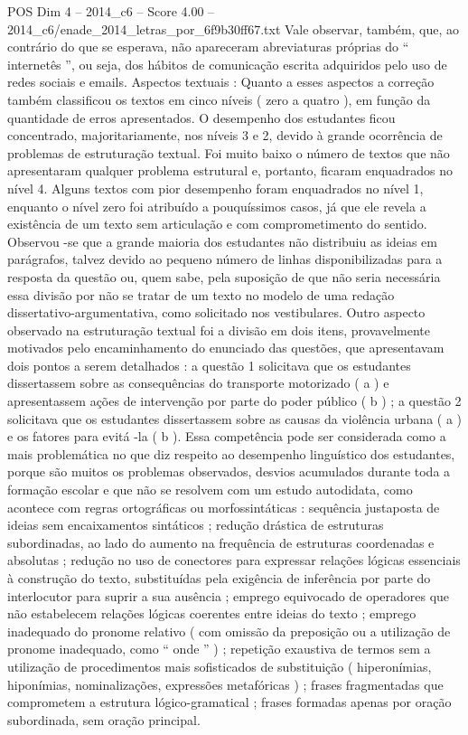 \begin{textsample}{POS Dim 4 – 2014\_c6 – Score 4.00 – 2014\_c6/enade\_2014\_letras\_por\_6f9b30ff67.txt}
Vale observar, também, que, ao contrário do que se esperava, não apareceram abreviaturas próprias do “ internetês ”, ou seja, dos hábitos de comunicação escrita adquiridos pelo uso de redes sociais e emails.
Aspectos textuais : Quanto a esses aspectos a correção também classificou os textos em cinco níveis ( zero a quatro ), em função da quantidade de erros apresentados.
O desempenho dos estudantes ficou concentrado, majoritariamente, nos níveis 3 e 2, devido à grande ocorrência de problemas de estruturação textual.
Foi muito baixo o número de textos que não apresentaram qualquer problema estrutural e, portanto, ficaram enquadrados no nível 4.
Alguns textos com pior desempenho foram enquadrados no nível 1, enquanto o nível zero foi atribuído a pouquíssimos casos, já que ele revela a existência de um texto sem articulação e com comprometimento do sentido.
Observou -se que a grande maioria dos estudantes não distribuiu as ideias em parágrafos, talvez devido ao pequeno número de linhas disponibilizadas para a resposta da questão ou, quem sabe, pela suposição de que não seria necessária essa divisão por não se tratar de um texto no modelo de uma redação dissertativo-argumentativa, como solicitado nos vestibulares.
Outro aspecto observado na estruturação textual foi a divisão em dois itens, provavelmente motivados pelo encaminhamento do enunciado das questões, que apresentavam dois pontos a serem detalhados : a questão 1 solicitava que os estudantes dissertassem sobre as consequências do transporte motorizado ( a ) e apresentassem ações de intervenção por parte do poder público ( b ) ; a questão 2 solicitava que os estudantes dissertassem sobre as causas da violência urbana ( a ) e os fatores para evitá -la ( b ).
Essa competência pode ser considerada como a mais problemática no que diz respeito ao desempenho linguístico dos estudantes, porque são muitos os problemas observados, desvios acumulados durante toda a formação escolar e que não se resolvem com um estudo autodidata, como acontece com regras ortográficas ou morfossintáticas : sequência justaposta de ideias sem encaixamentos sintáticos ; redução drástica de estruturas subordinadas, ao lado do aumento na frequência de estruturas coordenadas e absolutas ; redução no uso de conectores para expressar relações lógicas essenciais à construção do texto, substituídas pela exigência de inferência por parte do interlocutor para suprir a sua ausência ; emprego equivocado de operadores que não estabelecem relações lógicas coerentes entre ideias do texto ; emprego inadequado do pronome relativo ( com omissão da preposição ou a utilização de pronome inadequado, como “ onde ” ) ; repetição exaustiva de termos sem a utilização de procedimentos mais sofisticados de substituição ( hiperonímias, hiponímias, nominalizações, expressões metafóricas ) ; frases fragmentadas que comprometem a estrutura lógico-gramatical ; frases formadas apenas por oração subordinada, sem oração principal.

\end{textsample}
